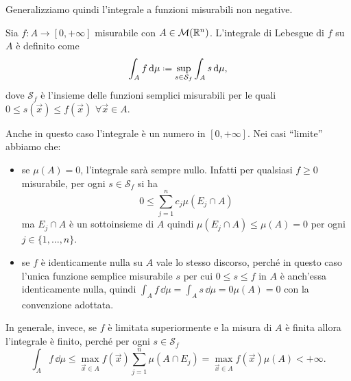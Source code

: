 Generalizziamo quindi l'integrale a funzioni misurabili non negative.
\begin{definizione} \label{d:integrale-lebesgue-funzioni-nonnegative}
	Sia $f\colon A\to[0,+\infty]$ misurabile con $A\in\mathcal M(\mathbb{R}^n)$.
	L'integrale di Lebesgue di $f$ su $A$ è definito come
	\begin{equation}
		\int_Af\,\dd\mu\defeq \sup_{s\in\mathcal S_f}\int_As\,\dd\mu,
		\label{eq:integrale-lebesgue-funzioni-nonnegative}
	\end{equation}
	dove $\mathcal S_f$ è l'insieme delle funzioni semplici misurabili per le quali $0\leq s(\vec x)\leq f(\vec x)$ $\forall\vec x\in A$.
\end{definizione}
Anche in questo caso l'integrale è un numero in $[0,+\infty]$.
Nei casi ``limite'' abbiamo che:
\begin{itemize}
	\item se $\mu(A)=0$, l'integrale sarà sempre nullo.
		Infatti per qualsiasi $f\geq 0$ misurabile, per ogni $s\in\mathcal S_f$ si ha
		\begin{equation}
			0\leq \sum_{j=1}^nc_j\mu(E_j\cap A)
		\end{equation}
		ma $E_j\cap A$ è un sottoinsieme di $A$ quindi $\mu(E_j\cap A)\leq\mu(A)=0$ per ogni $j\in\{1,\dots,n\}$.
	\item se $f$ è identicamente nulla su $A$ vale lo stesso discorso, perch\'e in questo caso l'unica funzione semplice misurabile $s$ per cui $0\leq s\leq f$ in $A$ è anch'essa identicamente nulla, quindi $\int_Af\,\dd\mu=\int_As\,\dd\mu=0\mu(A)=0$ con la convenzione adottata.
\end{itemize}
In generale, invece, se $f$ è limitata superiormente e la misura di $A$ è finita allora l'integrale è finito, perch\'e per ogni $s\in\mathcal S_f$
\begin{equation}
	\int_Af\,\dd\mu\leq\max_{\vec x\in A}f(\vec x)\sum_{j=1}^n\mu(A\cap E_j)=\max_{\vec x\in A}f(\vec x)\mu(A)<+\infty.
\end{equation}

